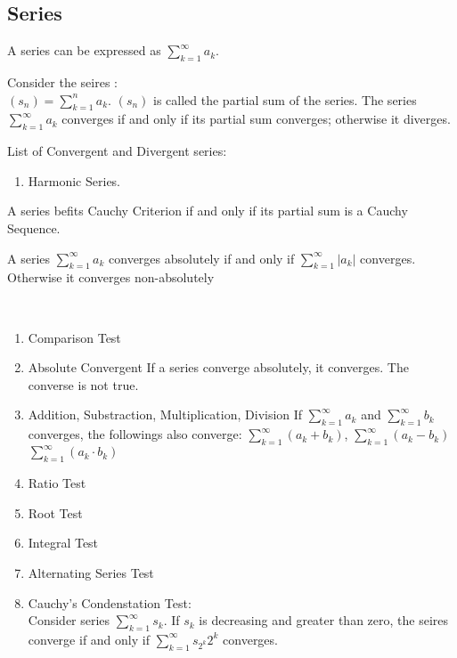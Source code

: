 \documentclass[../note.tex]{subfiles}
\begin{document}
\subsection{Series}
\begin{definition}[Series]
	A series can be expressed as $ \sum^{\infty}_{k=1} a_k$. 
\end{definition}
\begin{definition}
	Consider the seires :\\
	$(s_n)=\sum^{n}_{k=1} a_k$. $(s_n)$ is called the partial sum of the series. The series $\sum^{\infty}_{k=1}a_k $ converges if and only if its partial sum converges; otherwise it diverges. 
\end{definition}
\begin{example}
List of Convergent and Divergent series:
\begin{enumerate}
	\item Harmonic Series.
\end{enumerate}
\end{example}

\begin{definition}A series befits Cauchy Criterion if and only if its partial sum is a Cauchy Sequence. \end{definition}

\begin{definition} A series $\sum^{\infty}_{k=1}a_k$ converges absolutely if and only if $\sum^{\infty}_{k=1}|a_k|$ converges. Otherwise it converges non-absolutely
\end{definition}
\begin{theorem}\label{th:ConvergenceReveries}
\ 
\begin{enumerate}
	\item Comparison Test
	\item \label{th:ConvergenceReveries:en:absoluteconverge} Absolute Convergent
		If a series converge absolutely, it converges. The converse is not true. 
	\item Addition, Substraction, Multiplication, Division
		If $\sum^{\infty}_{k=1}a_k $ and $\sum^{\infty}_{k=1}b_k$ converges, the followings also converge:
		$\sum^{\infty}_{k=1}(a_k+b_k) $, $\sum^{\infty}_{k=1}(a_k-b_k) $ $\sum^{\infty}_{k=1}(a_k\cdot b_k)$
	\item Ratio Test
	\item Root Test
	\item Integral Test
	\item Alternating Series Test
	\item \label{Cauchy_Condensation_Test}Cauchy's Condenstation Test:\\
		Consider series $\sum^{\infty}_{k=1}s_k$. If ${s_k}$ is decreasing and greater than zero, the seires converge if and only if $\sum^{\infty}_{k=1}s_{2^k}2^k $ converges. 

\end{enumerate}
\end{theorem}
\end{document}
